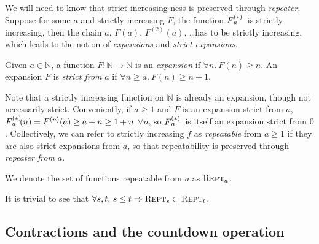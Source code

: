 {\color{red}
We will need to know that strict increasing-ness is preserved through \emph{repeater}. Suppose for some $a$ and strictly increasing $F$, the function $\rf{F}{a}\ $ is strictly increasing, then the chain $a$, $F(a)$, $F^{(2)}(a)$, \ldots has to be strictly increasing, which leads to the notion of \emph{expansions} and \emph{strict expansions}.
\begin{defn}
Given $a\in \mathbb{N}$, a function $F:\mathbb{N}\to\mathbb{N}$ is an \emph{expansion} if $\forall n.~ F(n)\ge n$. An expansion $F$ is \emph{strict from} $a$ if $\forall n \ge a.~ F(n)\ge n+1$.
\end{defn}
Note that a strictly increasing function on $\mathbb{N}$ is already an expansion, though not necessarily strict. Conveniently, if $a\ge 1$ and $F$ is an expansion strict from $a$, $\rf{F}{a}(n) = F^{(n)}(a) \ge a + n \ge 1 + n$ $\forall n$, so $\rf{F}{a}\ $ is itself an expansion strict from $0$. Collectively, we can refer to strictly increasing $f$ as \emph{repeatable} from $a\ge 1$ if they are also strict expansions from $a$, so that repeatability is preserved through \emph{repeater from} $a$.


\begin{defn}
We denote the set of functions repeatable from $a$ as $\text{\scshape{Rept}}_a$.
\end{defn}
\begin{rem} \label{rem: repeatable-subset}
	It is trivial to see that $\forall s, t.~ s \le t \Rightarrow \text{\scshape{Rept}}_s \subset \text{\scshape{Rept}}_t $.
\end{rem}
}

\subsection{Contractions and the countdown operation}

